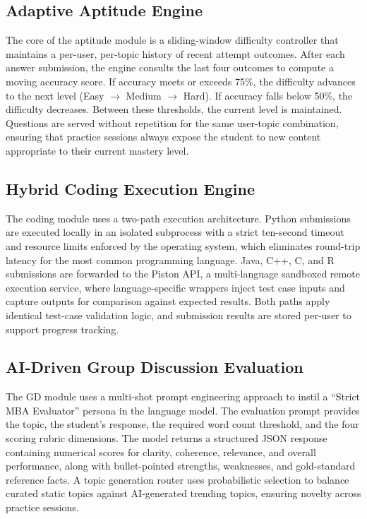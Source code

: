 \documentclass[12pt,a4paper]{report}
\begin{document}
\subsection{Adaptive Aptitude Engine}

The core of the aptitude module is a sliding-window difficulty controller that maintains a per-user, per-topic history of recent attempt outcomes. After each answer submission, the engine consults the last four outcomes to compute a moving accuracy score. If accuracy meets or exceeds 75\%, the difficulty advances to the next level (Easy $\to$ Medium $\to$ Hard). If accuracy falls below 50\%, the difficulty decreases. Between these thresholds, the current level is maintained. Questions are served without repetition for the same user-topic combination, ensuring that practice sessions always expose the student to new content appropriate to their current mastery level.

\subsection{Hybrid Coding Execution Engine}

The coding module uses a two-path execution architecture. Python submissions are executed locally in an isolated subprocess with a strict ten-second timeout and resource limits enforced by the operating system, which eliminates round-trip latency for the most common programming language. Java, C++, C, and R submissions are forwarded to the Piston API, a multi-language sandboxed remote execution service, where language-specific wrappers inject test case inputs and capture outputs for comparison against expected results. Both paths apply identical test-case validation logic, and submission results are stored per-user to support progress tracking.

\subsection{AI-Driven Group Discussion Evaluation}

The GD module uses a multi-shot prompt engineering approach to instil a ``Strict MBA Evaluator'' persona in the language model. The evaluation prompt provides the topic, the student's response, the required word count threshold, and the four scoring rubric dimensions. The model returns a structured JSON response containing numerical scores for clarity, coherence, relevance, and overall performance, along with bullet-pointed strengths, weaknesses, and gold-standard reference facts. A topic generation router uses probabilistic selection to balance curated static topics against AI-generated trending topics, ensuring novelty across practice sessions.
\end{document}
